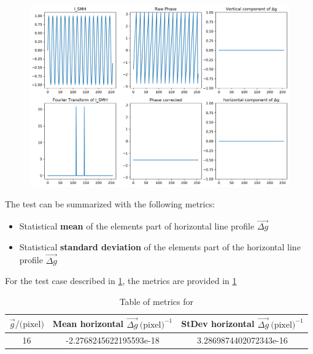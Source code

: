 \documentclass[12pt, titlepage]{article}
\begin{document}
\begin{figure}[H]
\begin{center}
\includegraphics[scale=0.5]{Figures/Test_2_explanation_1D.png}
\caption{}
\label{fig:Test_2_explaination_1D}
\end{center}
\end{figure}

The test can be summarized with the following metrics:
\begin{itemize}
\item Statistical \textbf{mean} of the elements part of horizontal line profile $\overrightarrow{\Delta g}$
\item Statistical \textbf{standard deviation} of the elements part of the horizontal line profile $\overrightarrow{\Delta g}$
\end{itemize}

For the test case described in \cref{fig:Test_2_explaination_1D}, the metrics are provided in \cref{tb:Metric_test_2_single_case}

\begin{table}[H]
\centering
\begin{tabular}{|c|c|c|}
\hline
$\overrightarrow{g} / \text{(pixel)}$ & Mean horizontal $\overrightarrow{\Delta g} \ \text{(pixel)}^{-1}$ & StDev horizontal $\overrightarrow{\Delta g} \ \text{(pixel)}^{-1}$ \\
\hline
16			& -2.2768245622195593e-18 & 3.2869874402072343e-16 \\ \hline
\end{tabular}
\caption{Table of metrics for}\label{tb:Metric_test_2_single_case}
\end{table}
\end{document}
